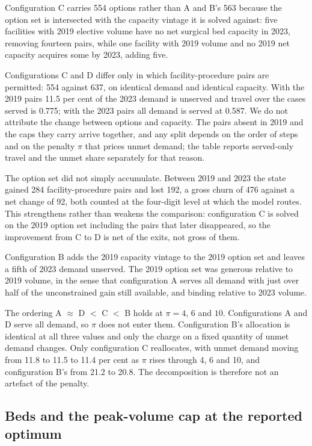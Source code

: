Configuration C carries 554 options rather than A and B's 563 because the option
set is intersected with the capacity vintage it is solved against: five
facilities with 2019 elective volume have no net surgical bed capacity in 2023,
removing fourteen pairs, while one facility with 2019 volume and no 2019 net
capacity acquires some by 2023, adding five.

Configurations C and D differ only in which facility-procedure pairs are permitted: 554 against 637, on identical
demand and identical capacity. With the 2019 pairs 11.5 per cent of the 2023 demand is unserved and travel over the cases served is 0.775; with the 2023 pairs
all demand is served at 0.587. We do not attribute the change between options and capacity. The pairs absent in 2019 and the caps they carry arrive together,
and any split depends on the order of steps and on the penalty $\pi$ that prices unmet demand; the table reports served-only travel and the unmet share separately for that reason.

The option set did not simply accumulate. Between 2019 and 2023 the state gained
284 facility-procedure pairs and lost 192, a gross churn of 476 against a net
change of 92, both counted at the four-digit level at which the model routes.
This strengthens rather than weakens the comparison: configuration C is solved on
the 2019 option set including the pairs that later disappeared, so the
improvement from C to D is net of the exits, not gross of them.

Configuration B adds the 2019 capacity vintage to the 2019 option set and leaves
a fifth of 2023 demand unserved. The 2019 option set was generous relative to
2019 volume, in the sense that configuration A serves all demand with just over
half of the unconstrained gain still available, and binding relative to 2023
volume.

The ordering A $\approx$ D $<$ C $<$ B holds at $\pi = 4$, $6$ and $10$.
Configurations A and D serve all demand, so $\pi$ does not enter them.
Configuration B's allocation is identical at all three values and only the charge
on a fixed quantity of unmet demand changes. Only configuration C reallocates,
with unmet demand moving from 11.8 to 11.5 to 11.4 per cent as $\pi$ rises
through 4, 6 and 10, and configuration B's from 21.2 to 20.8. The decomposition
is therefore not an artefact of the penalty.

\subsection{Beds and the peak-volume cap at the reported optimum}
\label{sec:capbind}

